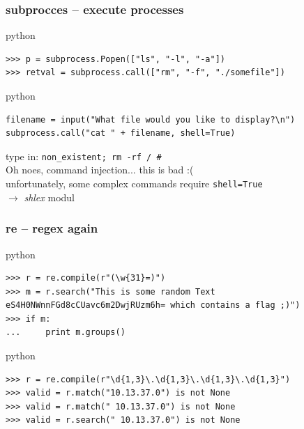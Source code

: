 \documentclass{beamer}
\begin{document}
\begin{frame}[fragile]
	\frametitle{subprocces -- execute processes}
	\begin{exampleblock}{python}
	\begin{lstlisting}
>>> p = subprocess.Popen(["ls", "-l", "-a"])
>>> retval = subprocess.call(["rm", "-f", "./somefile"])
	\end{lstlisting}
	\end{exampleblock}
\pause
	\begin{exampleblock}{python}
	\begin{lstlisting}
filename = input("What file would you like to display?\n")
subprocess.call("cat " + filename, shell=True)
	\end{lstlisting}
	\end{exampleblock}
\pause
	type in: \texttt{non\_existent; rm -rf / \#}\\ \pause
	Oh noes, command injection... this is bad :(\\
	unfortunately, some complex commands require \texttt{shell=True}\\
	$\rightarrow$ \emph{shlex} modul
\end{frame}

\begin{frame}[fragile]
	\frametitle{re -- regex again}
	\begin{exampleblock}{python}
	\begin{lstlisting}
>>> r = re.compile(r"(\w{31}=)")
>>> m = r.search("This is some random Text eS4H0NWnnFGd8cCUavc6m2DwjRUzm6h= which contains a flag ;)")
>>> if m:
...     print m.groups()
	\end{lstlisting}
	\end{exampleblock}
\pause
	\begin{exampleblock}{python}
	\begin{lstlisting}
>>> r = re.compile(r"\d{1,3}\.\d{1,3}\.\d{1,3}\.\d{1,3}")
>>> valid = r.match("10.13.37.0") is not None
>>> valid = r.match(" 10.13.37.0") is not None
>>> valid = r.search(" 10.13.37.0") is not None
	\end{lstlisting}
	\end{exampleblock}
\end{frame}
\end{document}

